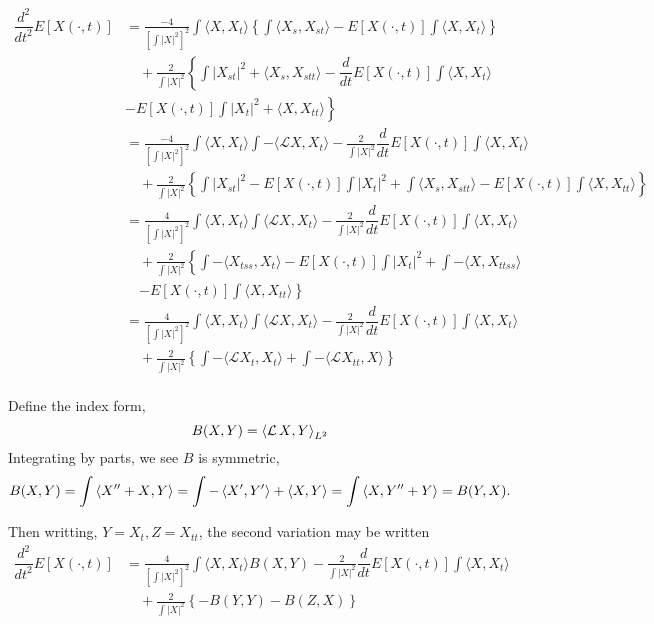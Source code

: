 \documentclass[12pt]{article}
\begin{document}
\begin{align*}
\dfrac{d^2}{dt^2}E[X(\cdot,t)] &= \frac{-4}{\left[\int|X|^2\right]^2}    \int \langle X,X_t\rangle \left\lbrace \int \langle X_s,X_{st}\rangle - E[X(\cdot,t)] \int\langle X,X_t\rangle \right\rbrace \\
&\quad +\frac2{\int|X|^2} \left\lbrace   \int  |X_{st}|^2 +\langle X_{s},X_{stt}\rangle - \dfrac{d}{dt}E[X(\cdot,t)]  \int\langle X,X_t\rangle \right. \\
& \left.  - E[X(\cdot,t)] \int |X_t|^2 +\langle X,X_{tt}\rangle \right\rbrace \\
&= \frac{-4}{\left[\int|X|^2\right]^2} \int \langle X,X_t\rangle \int -\langle \mathcal{L}X,X_t\rangle   - \frac2{\int|X|^2} \dfrac{d}{dt}E[X(\cdot,t)]  \int\langle X,X_t\rangle \\
&\quad +\frac2{\int|X|^2} \left\lbrace   \int  |X_{st}|^2 - E[X(\cdot,t)] \int |X_t|^2 +\int \langle X_{s},X_{stt}\rangle - E[X(\cdot,t)] \int \langle X,X_{tt}\rangle \right\rbrace \\
&= \frac{4}{\left[\int|X|^2\right]^2} \int \langle X,X_t\rangle \int   \langle \mathcal{L}X,X_t\rangle - \frac2{\int|X|^2} \dfrac{d}{dt}E[X(\cdot,t)]  \int\langle X,X_t\rangle \\
&\quad+ \frac2{\int|X|^2} \left\lbrace \int-\langle X_{tss},X_t\rangle  - E[X(\cdot,t)] \int |X_t|^2 +\int - \langle X,X_{ttss}\rangle \right. \\
&\quad \left. - E[X(\cdot,t)] \int \langle X,X_{tt}\rangle \right\rbrace \\
&= \frac{4}{\left[\int|X|^2\right]^2} \int \langle X,X_t\rangle \int \langle \mathcal{L}X,X_t\rangle - \frac2{\int|X|^2} \dfrac{d}{dt}E[X(\cdot,t)]  \int\langle X,X_t\rangle \\
&\quad + \frac2{\int|X|^2} \left\lbrace   \int  -\langle \mathcal{L}X_{t},X_t\rangle   +\int -  \langle \mathcal{L}X_{tt},X \rangle\right\rbrace \\
\end{align*}

Define the index form,
\[
B(X, Y) = \left\langle{\operatorname{\mathcal{L}}X},{Y}\right\rangle_{L^2}
\]
Integrating by parts, we see \(B\) is symmetric,
\[
B(X, Y) = \int \left\langle{X'' + X},{Y}\right\rangle = \int-\left\langle{X'},{Y'}\right\rangle + \left\langle{X},{Y}\right\rangle = \int \left\langle{X},{Y'' + Y}\right\rangle = B(Y, X).
\]

Then writting, \(Y = X_t, Z = X_{tt}\), the second variation may be written
\begin{align*}
\dfrac{d^2}{dt^2}E[X(\cdot,t)] &= \frac{4}{\left[\int|X|^2\right]^2} \int \langle X,X_t\rangle B(X, Y) - \frac2{\int|X|^2} \dfrac{d}{dt}E[X(\cdot,t)]  \int\langle X,X_t\rangle \\
&\quad + \frac2{\int|X|^2} \left\lbrace -B(Y, Y) - B(Z, X) \right\rbrace \\
\end{align*}
\end{document}
